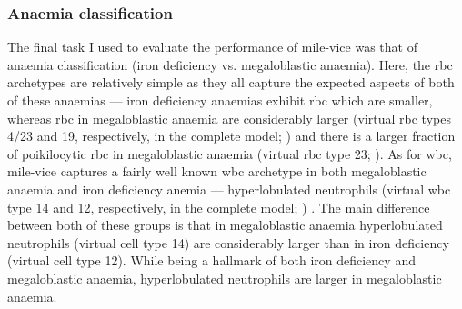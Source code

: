 \begin{figure}[!ht]
    \label{fig:rbc-mds-classification-examples}
\end{figure}

\begin{figure}[!ht]
    \label{fig:wbc-mds-classification-examples}
\end{figure}

\subsubsection{Anaemia classification} 

The final task I used to evaluate the performance of \ac{mile-vice} was that of anaemia classification (iron deficiency vs. megaloblastic anaemia). Here, the \ac{rbc} archetypes are relatively simple as they all capture the expected aspects of both of these anaemias --- iron deficiency anaemias exhibit \ac{rbc} which are smaller, whereas \ac{rbc} in megaloblastic anaemia are considerably larger (virtual \ac{rbc} types 4/23 and 19, respectively, in the complete model; ) and there is a larger fraction of poikilocytic \ac{rbc} in megaloblastic anaemia (virtual \ac{rbc} type 23; ). As for \ac{wbc}, \ac{mile-vice} captures a fairly well known \ac{wbc} archetype in both megaloblastic anaemia and iron deficiency anemia --- hyperlobulated neutrophils (virtual \ac{wbc} type 14 and 12, respectively, in the complete model; ) \cite{Lindenbaum1980-ux,Westerman1999-gs}. The main difference between both of these groups is that in megaloblastic anaemia hyperlobulated neutrophils (virtual cell type 14) are considerably larger than in iron deficiency (virtual cell type 12). While being a hallmark of both iron deficiency and megaloblastic anaemia, hyperlobulated neutrophils are larger in megaloblastic anaemia.

\begin{figure}[!ht]
    \label{fig:mile-vice-vcq-so-anaemia-classification}
\end{figure}

